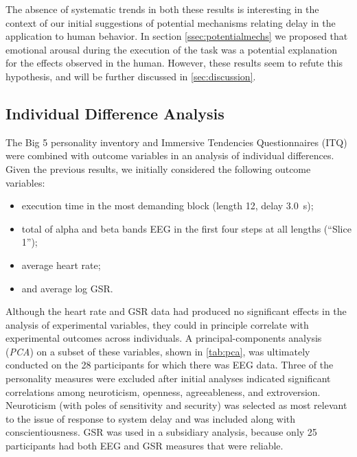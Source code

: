 \documentclass[10pt,letterpaper]{article}
\begin{document}
The absence of systematic trends in both these results is interesting in the context of our initial suggestions of potential mechanisms relating delay in the application to human behavior.
In section \cref{ssec:potentialmechs} we proposed that emotional arousal during the execution of the task was a potential explanation for the effects observed in the human.
However, these results seem to refute this hypothesis, and will be further discussed in \cref{sec:discussion}.

\subsection{Individual Difference Analysis}

The Big 5 personality inventory and Immersive Tendencies Questionnaires (ITQ) were combined with outcome variables in an analysis of individual differences.
Given the previous results, we initially considered the following outcome variables:
\begin{itemize}
    \item execution time in the most demanding block (length 12, delay \SI{3.0}{\second}); 
    \item total of alpha and beta bands EEG in the first four steps at all lengths (``Slice 1'');
    \item average heart rate;
    \item and average log GSR.\@
\end{itemize}

Although the heart rate and GSR data had produced no significant effects in the analysis of experimental variables, they could in principle correlate with experimental outcomes across individuals. 
A principal-components analysis (\emph{PCA}) on a subset of these variables, shown in \cref{tab:pca}, was ultimately conducted on the 28 participants for which there was EEG data. 
Three of the personality measures were excluded after initial analyses indicated significant correlations among neuroticism, openness, agreeableness, and extroversion.
Neuroticism (with poles of sensitivity and security) was selected as most relevant to the issue of response to system delay and was included along with conscientiousness.
GSR was used in a subsidiary analysis, because only 25 participants had both EEG and GSR measures that were reliable.
\end{document}
